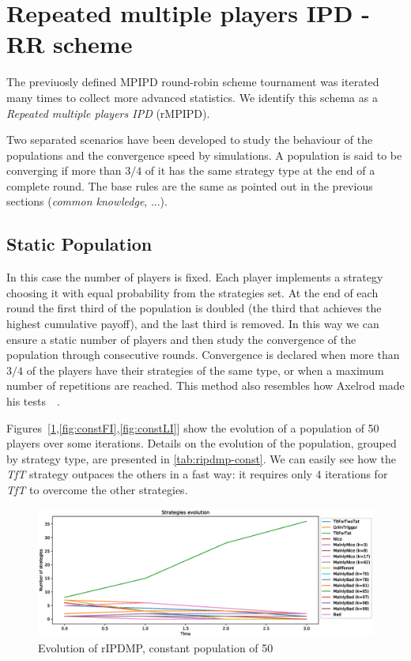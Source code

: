 \documentclass[journal,a4paper,10pt,twoside]{IEEEtran} %
\begin{document}
\section{Repeated multiple players IPD - RR scheme} \label{s:rIPDMP}
The previuosly defined MPIPD round-robin scheme tournament was iterated many times to collect more advanced statistics.
We identify this schema as a \textit{Repeated multiple players IPD} (rMPIPD).

Two separated scenarios have been developed to study the behaviour of the populations and the convergence speed by simulations. A population is said to be converging if more than $3/4$ of it has the same strategy type at the end of a complete round. The base rules are the same as pointed out in the previous sections (\textit{common knowledge}, ...).

\subsection{Static Population}
In this case the number of players is fixed. Each player implements a strategy choosing it with equal probability from the strategies set. At the end of each round the first third of the population is doubled (the third that achieves the highest cumulative payoff), and the last third is removed. In this way we can ensure a static number of players and then study the convergence of the population through consecutive rounds.
Convergence is declared when more than $3/4$ of the players have their strategies of the same type, or when a maximum number of repetitions are reached.
This method also resembles how Axelrod made his tests~\cite[\S 2.6]{mathieu2017}~\cite{axelrod1984evolution}.

Figures~[\ref{fig:constR},\ref{fig:constFI},\ref{fig:constLI}] show the evolution of a population of 50 players over some iterations.
Details on the evolution of the population, grouped by strategy type, are presented in \autoref{tab:ripdmp-const}.
We can easily see how the \textit{TfT} strategy outpaces the others in a fast way: it requires only $4$ iterations for \textit{TfT} to overcome the other strategies.

\begin{figure}[!ht]
    \centering
    \includegraphics[width=1\columnwidth]{../img/ripdmp-const/ripdmp-evolution-const-pop-50}
    \caption{Evolution of rIPDMP, constant population of 50}
    \label{fig:constR}
\end{figure}
\end{document}
